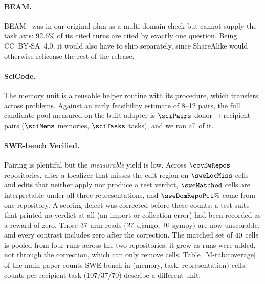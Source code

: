 \paragraph{BEAM.}
BEAM~\cite{beam} was in our original plan as a multi-domain check but cannot
supply the task axis: 92.6\% of its cited turns are cited by exactly one
question. Being CC~BY-SA~4.0, it would also have to ship separately, since
ShareAlike would otherwise relicense the rest of the release.

\paragraph{SciCode.}
The memory unit is a reusable helper routine with its procedure, which
transfers across problems. Against an early feasibility estimate of 8--12
pairs, the full candidate pool measured on the built adapter is $\sciPairs$
donor$\to$recipient pairs ($\sciMems$ memories, $\sciTasks$ tasks), and we
ran all of it.

\paragraph{SWE-bench Verified.}
Pairing is plentiful but the \emph{measurable} yield is low. Across
$\covSwRepos$ repositories, after a localizer that misses the edit region on
$\sweLocMiss$ cells and edits that neither apply nor produce a test verdict,
$\sweMatched$ cells are interpretable under all three representations, and
$\sweDomRepoPct\%$ come from one repository. A scoring defect was corrected before these counts: a test suite
that printed no verdict at all (an import or collection error) had been
recorded as a reward of zero. Those $37$ arm-reads
($27$ django, $10$ sympy) are now unscorable, and
every contrast includes zero after the correction. The matched set of
$40$ cells is pooled from four runs across the two repositories; it grew as runs were added, not through the correction, which can only
remove cells. Table~\ref*{M-tab:coverage} of the main paper counts SWE-bench in
(memory, task, representation) cells; counts per recipient task (107/37/70)
describe a different unit.
